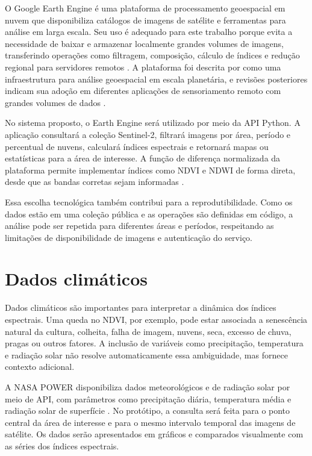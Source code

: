 O Google Earth Engine é uma plataforma de processamento geoespacial em nuvem que disponibiliza catálogos de imagens de satélite e ferramentas para análise em larga escala. Seu uso é adequado para este trabalho porque evita a necessidade de baixar e armazenar localmente grandes volumes de imagens, transferindo operações como filtragem, composição, cálculo de índices e redução regional para servidores remotos \citep{GOOGLE_S2_SR}. A plataforma foi descrita por \citet{GORELICK2017} como uma infraestrutura para análise geoespacial em escala planetária, e revisões posteriores indicam sua adoção em diferentes aplicações de sensoriamento remoto com grandes volumes de dados \citep{AMANI2020}.

No sistema proposto, o Earth Engine será utilizado por meio da API Python. A aplicação consultará a coleção Sentinel-2, filtrará imagens por área, período e percentual de nuvens, calculará índices espectrais e retornará mapas ou estatísticas para a área de interesse. A função de diferença normalizada da plataforma permite implementar índices como NDVI e NDWI de forma direta, desde que as bandas corretas sejam informadas \citep{GOOGLE_EE_ND}.

Essa escolha tecnológica também contribui para a reprodutibilidade. Como os dados estão em uma coleção pública e as operações são definidas em código, a análise pode ser repetida para diferentes áreas e períodos, respeitando as limitações de disponibilidade de imagens e autenticação do serviço.

\section{Dados climáticos}

Dados climáticos são importantes para interpretar a dinâmica dos índices espectrais. Uma queda no NDVI, por exemplo, pode estar associada a senescência natural da cultura, colheita, falha de imagem, nuvens, seca, excesso de chuva, pragas ou outros fatores. A inclusão de variáveis como precipitação, temperatura e radiação solar não resolve automaticamente essa ambiguidade, mas fornece contexto adicional.

A NASA POWER disponibiliza dados meteorológicos e de radiação solar por meio de API, com parâmetros como precipitação diária, temperatura média e radiação solar de superfície \citep{NASA_POWER_DAILY}. No protótipo, a consulta será feita para o ponto central da área de interesse e para o mesmo intervalo temporal das imagens de satélite. Os dados serão apresentados em gráficos e comparados visualmente com as séries dos índices espectrais.

